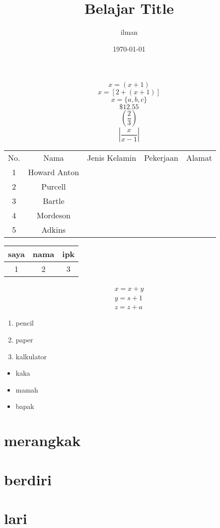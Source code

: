 \documentclass[12pt]{article}
\begin{document}
\title{Belajar Title}
\author{ilman}
\date{\today}
\maketitle
	$$x = (x+1)$$
	$$x = [2+(x+1)]$$
	$$x = \{a,b,c\}$$
	$$\$ 12.55 $$
	$$\left(\frac{2}{3}\right)$$
	$$|\frac{x}{x-1}|$$

	

\begin{tabular}{ccccc}
No. & Nama & Jenis Kelamin & Pekerjaan & Alamat\\
1   & Howard Anton & & &\\
2   & Purcell & & &\\
3   & Bartle & & &\\
4   & Mordeson & &\\
5   & Adkins & & &\\
\end{tabular}

\begin{tabular}{c|c|c}
	saya & nama & ipk\\ \hline
	1 & 2 & 3 \\
\end{tabular}

\begin{eqnarray}
x = x + y\\
y = s + 1\\
z = z + a
\end{eqnarray}

\begin{enumerate}
\item pencil
\item paper
\item kalkulator
\end{enumerate}

\begin{itemize}
\item kaka
\item mamah
\item bapak
\end{itemize}
\section{merangkak}
\section{berdiri}
\section{lari}
\end{document}
